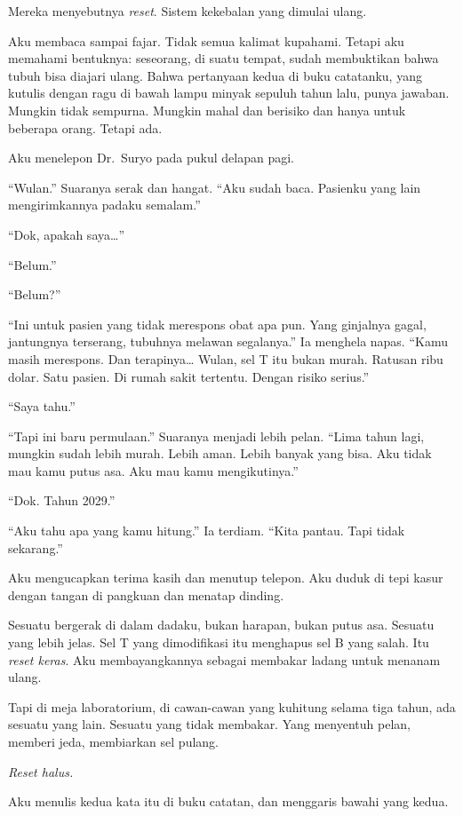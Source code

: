 \documentclass[11pt,twoside,openany]{book}
\begin{document}
Mereka menyebutnya \emph{reset}. Sistem kekebalan yang dimulai ulang.

Aku membaca sampai fajar. Tidak semua kalimat kupahami. Tetapi aku memahami bentuknya: seseorang, di suatu tempat, sudah membuktikan bahwa tubuh bisa diajari ulang. Bahwa pertanyaan kedua di buku catatanku, yang kutulis dengan ragu di bawah lampu minyak sepuluh tahun lalu, punya jawaban. Mungkin tidak sempurna. Mungkin mahal dan berisiko dan hanya untuk beberapa orang. Tetapi ada.

Aku menelepon Dr.~Suryo pada pukul delapan pagi.

``Wulan.'' Suaranya serak dan hangat. ``Aku sudah baca. Pasienku yang lain mengirimkannya padaku semalam.''

``Dok, apakah saya\ldots{}''

``Belum.''

``Belum?''

``Ini untuk pasien yang tidak merespons obat apa pun. Yang ginjalnya gagal, jantungnya terserang, tubuhnya melawan segalanya.'' Ia menghela napas. ``Kamu masih merespons. Dan terapinya\ldots{} Wulan, sel T itu bukan murah. Ratusan ribu dolar. Satu pasien. Di rumah sakit tertentu. Dengan risiko serius.''

``Saya tahu.''

``Tapi ini baru permulaan.'' Suaranya menjadi lebih pelan. ``Lima tahun lagi, mungkin sudah lebih murah. Lebih aman. Lebih banyak yang bisa. Aku tidak mau kamu putus asa. Aku mau kamu mengikutinya.''

``Dok. Tahun 2029.''

``Aku tahu apa yang kamu hitung.'' Ia terdiam. ``Kita pantau. Tapi tidak sekarang.''

Aku mengucapkan terima kasih dan menutup telepon. Aku duduk di tepi kasur dengan tangan di pangkuan dan menatap dinding.

Sesuatu bergerak di dalam dadaku, bukan harapan, bukan putus asa. Sesuatu yang lebih jelas. Sel T yang dimodifikasi itu menghapus sel B yang salah. Itu \emph{reset keras}. Aku membayangkannya sebagai membakar ladang untuk menanam ulang.

Tapi di meja laboratorium, di cawan-cawan yang kuhitung selama tiga tahun, ada sesuatu yang lain. Sesuatu yang tidak membakar. Yang menyentuh pelan, memberi jeda, membiarkan sel pulang.

\emph{Reset halus.}

Aku menulis kedua kata itu di buku catatan, dan menggaris bawahi yang kedua.
\end{document}

